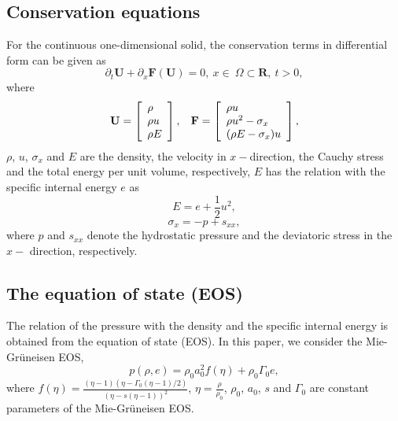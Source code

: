 \documentclass[review]{elsarticle}
\begin{document}
\subsection{Conservation equations}
For  the  continuous one-dimensional solid, the conservation terms  in differential form can be  given as
\begin{equation}
\partial_t \mathbf{{U}} + \partial _x \bm{F}(\mathbf{{U}}) = 0, \   x \in \   \Omega \subset \mathbf{R}, \  t>0,
\end{equation}
where
\begin{equation}
  \mathbf{U} = \left[ \begin{array}{l}
      \rho \\
      \rho u \\
      \rho  E \\
    \end{array}
  \right],
  \hspace{0.3cm}
  \mathbf{F} = \left[ \begin{array}{l}
      \rho u \\
      \rho u^2 -\sigma_x\\
      (\rho E -\sigma_x)u\\
  \end{array} \right],
\end{equation}
$\rho$, $u$, $\sigma_x$ and $E$ are  the density, the  velocity in $x-$direction,  the Cauchy stress and  the total energy per unit volume, respectively, $E$ has the relation with  the specific internal energy $e$ as
\begin{equation}
  E = e+\frac{1}{2}u^2,
\end{equation}
\begin{equation}
  \sigma_x = -p +s_{xx},
\end{equation}
where $p$ and $s_{xx}$ denote the  hydrostatic pressure and the  deviatoric stress in the $x-$ direction, respectively.

\subsection{The equation of state (EOS)}

The relation of the pressure with  the density and the specific internal energy is obtained from the equation of state (EOS). In this paper, we consider the Mie-Gr\"uneisen EOS,
\begin{equation}\label{eq:mie}
  p(\rho,e) = \rho_0 a_0^2f(\eta)+ \rho_0 \Gamma_0 e,
\end{equation}
where $f(\eta) = \frac{(\eta-1)(\eta-\Gamma_0(\eta-1)/2)}{(\eta-s(\eta-1))^2}$, $\eta = \frac{\rho}{\rho_0}$, $\rho_0$, $a_0$, $s$ and $\Gamma_0$ are constant parameters of the Mie-Gr\"uneisen EOS.
\end{document}
